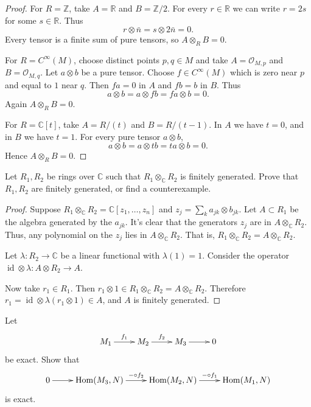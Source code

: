 \begin{proof}
For $R=\mathbb{Z}$, take
$A=\mathbb{R}$ and $B=\mathbb{Z}/2$.
For every $r\in \mathbb{R}$ we can write
$r=2s$ for some $s\in \mathbb{R}$.
Thus
$$
r\otimes \bar n=s\otimes 2\bar n=0.
$$
Every tensor is a finite sum of pure tensors,
so $A\otimes_R B=0$.

For $R=C^\infty(M)$, choose distinct points
$p,q\in M$ and take
$A=\mathcal{O}_{M,p}$ and
$B=\mathcal{O}_{M,q}$.
Let $a\otimes b$ be a pure tensor.
Choose $f\in C^\infty(M)$ which is zero
near $p$ and equal to $1$ near $q$.
Then $fa=0$ in $A$ and $fb=b$ in $B$.
Thus
$$
a\otimes b=a\otimes fb=fa\otimes b=0.
$$
Again $A\otimes_R B=0$.

For $R=\mathbb{C}[t]$, take
$A=R/(t)$ and $B=R/(t-1)$.
In $A$ we have $t=0$, and in $B$ we have
$t=1$.
For every pure tensor $a\otimes b$,
$$
a\otimes b=a\otimes tb=ta\otimes b=0.
$$
Hence $A\otimes_R B=0$.
\end{proof}


\begin{exercise}
\label{exercise-tensor-product-fg-or-not}
Let $R_1, R_2$ be rings over $\mathbb{C}$
such that $R_1 \otimes_{\mathbb{C}}R_2$
is finitely generated. Prove that
$R_1,R_2$ are finitely generated,
or find a counterexample.
\end{exercise}

\begin{proof}
Suppose 
$R_1 \otimes_{\mathbb{C}}R_2
= \mathbb{C}[z_1,…,z_n]$
and
$z_j=\sum_{k}a_{jk} \otimes b_{jk}$.
Let $A\subset R_1$ be the algebra
generated by the $a_{jk}$.
It's clear that the generators
$z_j$ are in $A\otimes_{\mathbb{C}}R_2$.
Thus, any polynomial on the $z_j$
lies in $A \otimes_{\mathbb{C}}R_2$.
That is, $R_1 \otimes_{\mathbb{C}}R_2
=A \otimes_{\mathbb{C}}R_2$.

Let $\lambda:R_2 \to \mathbb{C}$
be a linear functional with $\lambda(1)=1$.
Consider the operator
$\operatorname{id} \otimes \lambda:
A \otimes R_2 \to A$.

Now take $r_1 \in R_1$.
Then $r_1 \otimes 1 \in 
R_1 \otimes_{\mathbb{C}}R_2
=A \otimes_{\mathbb{C}}R_2$.
Therefore
$r_1=\operatorname{id}\otimes \lambda
(r_1 \otimes 1) \in A$,
and $A$ is finitely generated.
\end{proof}

\begin{exercise}
\label{exercise-left-hom-sends-right-exact}
Let
$$
\xymatrix{
M_1\ar[r]^{f_1}
&M_2\ar[r]^{f_2}
&M_3\ar[r]
&0
}
$$
be exact.
Show that
$$
\xymatrix{
0\ar[r]
&\Hom(M_3,N)\ar[r]^{-\circ f_2}
&\Hom(M_2,N)\ar[r]^{- \circ f_1}
&\Hom(M_1,N)
}
$$
is exact.
\end{exercise}

